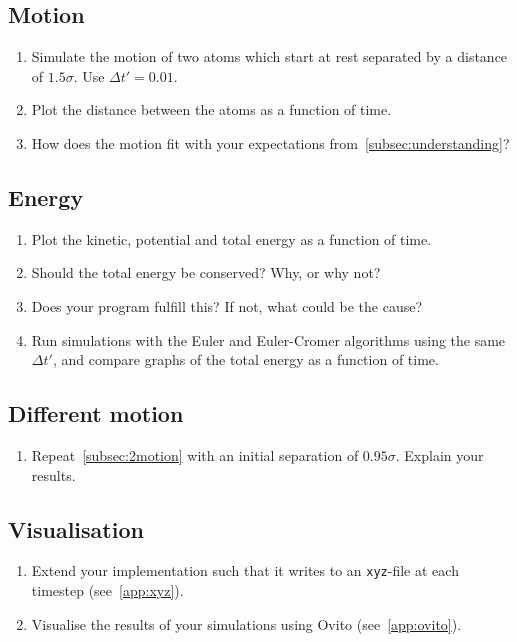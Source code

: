\documentclass[11pt,british,a4paper]{report}
\begin{document}
\subsection{Motion}\label{subsec:2motion}
\begin{enumerate}[label=\roman*.]
    \item Simulate the motion of two atoms which start at rest separated by a distance of \(\num{1.5}\sigma\). Use \(\Delta t'=\num{0.01}\).
    \item Plot the distance between the atoms as a function of time.
    \item How does the motion fit with your expectations from~\vref{subsec:understanding}?
\end{enumerate}

\subsection{Energy}
\begin{enumerate}[label=\roman*.]
    \item Plot the kinetic, potential and total energy as a function of time.
    \item Should the total energy be conserved? Why, or why not?
    \item Does your program fulfill this? If not, what could be the cause?
    \item Run simulations with the Euler and Euler-Cromer algorithms using the same \(\Delta t'\), and compare graphs of the total energy as a function of time.
\end{enumerate}

\subsection{Different motion}
\begin{enumerate}[label=\roman*.]
    \item Repeat~\vref{subsec:2motion} with an initial separation of \(\num{0.95}\sigma\). Explain your results.
\end{enumerate}

\subsection{Visualisation}
\begin{enumerate}[label=\roman*.]
    \item Extend your implementation such that it writes to an \texttt{xyz}-file at each timestep (see~\vref{app:xyz}).
    \item Visualise the results of your simulations using Ovito (see~\vref{app:ovito}).
\end{enumerate}
\end{document}
